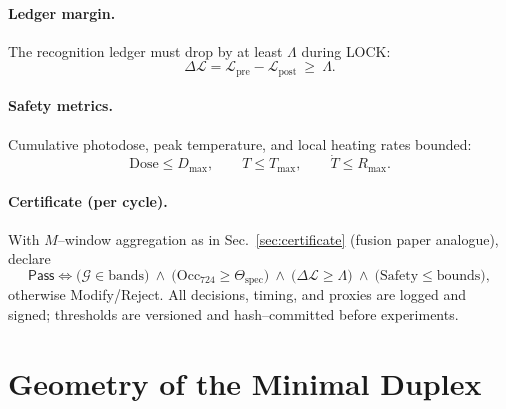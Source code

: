 \documentclass[11pt]{article}
\begin{document}
\paragraph{Ledger margin.}
The recognition ledger must drop by at least $\Lambda$ during \textsf{LOCK}:
\[
\Delta \mathcal{L}=\mathcal{L}_{\mathrm{pre}}-\mathcal{L}_{\mathrm{post}}\ \ge\ \Lambda.
\]

\paragraph{Safety metrics.}
Cumulative photodose, peak temperature, and local heating rates bounded:
\[
\mathrm{Dose}\le D_{\max},\qquad T\le T_{\max},\qquad \dot{T}\le R_{\max}.
\]

\paragraph{Certificate (per cycle).}
With $M$–window aggregation as in Sec.~\ref{sec:certificate} (fusion paper analogue), declare
\[
\textsf{Pass}\iff
\Big(\mathcal{G}\in\text{bands}\Big)\ \wedge\ \Big(\mathrm{Occ}_{724}\ge \Theta_{\mathrm{spec}}\Big)\ \wedge\ \Big(\Delta \mathcal{L}\ge \Lambda\Big)\ \wedge\ \Big(\text{Safety}\le \text{bounds}\Big),
\]
otherwise \textsf{Modify}/\textsf{Reject}. All decisions, timing, and proxies are logged and signed; thresholds are versioned and hash–committed before experiments.

\section{Geometry of the Minimal Duplex}
\end{document}
